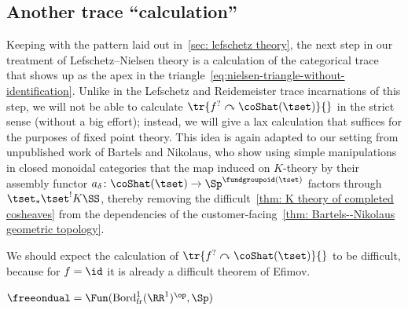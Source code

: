 \subsection{Another trace ``calculation''}
Keeping with the pattern laid out in~\cref{sec: lefschetz theory}, the next step in our treatment of Lefschetz--Nielsen theory is a calculation of the categorical trace that shows up as the apex in the triangle~\eqref{eq:nielsen-triangle-without-identification}. Unlike in the Lefschetz and Reidemeister trace incarnations of this step, we will not be able to calculate $\tr{f^?\curvearrowright\coShat (\tset )}{}$ in the strict sense (without a big effort); instead, we will give a lax calculation that suffices for the purposes of fixed point theory. This idea is again adapted to our setting from unpublished work of Bartels and Nikolaus, who show using simple manipulations in closed monoidal categories that the map induced on $K$-theory by their assembly functor $a_\delta\colon\coShat (\tset )\to \Sp^{\fundgroupoid (\tset )}$ factors through $\tset_*\tset^!K\SS$, thereby removing the difficult~\cref{thm: K theory of completed cosheaves} from the dependencies of the customer-facing~\cref{thm: Bartels--Nikolaus geometric topology}.

We should expect the calculation of $\tr{f^?\curvearrowright\coShat (\tset )}{}$ to be difficult, because for $f=\id$ it is already a difficult theorem of Efimov.
\begin{defn}
  $\freeondual = \Fun (\mathrm{Bord}^1_{\mathrm{fr}}(\RR^1)^{\op},\Sp )$
\end{defn}
 
\newpage

